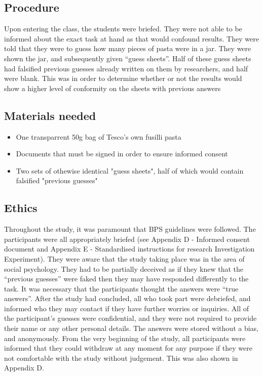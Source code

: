 \documentclass{report}
\begin{document}
\subsection{Procedure}
Upon entering the class, the students were briefed. They were not able to be informed about the exact task at hand as that would confound results. They were told that they were to guess how many pieces of pasta were in a jar. They were shown the jar, and subsequently given “guess sheets”. Half of these guess sheets had falsified previous guesses already written on them by researchers, and half were blank. This was in order to determine whether or not the results would show a higher level of conformity on the sheets with previous answers
\subsection{Materials needed}
\begin{itemize}
  \item One transparrent 50g bag of Tesco's own fusilli pasta
  \item Documents that must be signed in order to ensure informed consent
  \item Two sets of othewise identical "guess sheets", half of which would contain falsified "previous guesses"
\end{itemize}
\subsection{Ethics}
Throughout the study, it was paramount that BPS guidelines were followed. The participants were all appropriately briefed (see Appendix D - Informed consent document and Appendix E - Standardised instructions for research Investigation Experiment). They were aware that the study taking place was in the area of social psychology. They had to be partially deceived as if they knew that the “previous guesses” were faked then they may have responded differently to the task. It was necessary that the participants thought the answers were “true answers”. After the study had concluded, all who took part were debriefed, and informed who they may contact if they have further worries or inquiries. All of the participant’s guesses were confidential, and they were not required to provide their name or any other personal details. The answers were stored without a bias, and anonymously. From the very beginning of the study, all participants were informed that they could withdraw at any moment for any purpose if they were not comfortable with the study without judgement. This was also shown in Appendix D.
\end{document}
